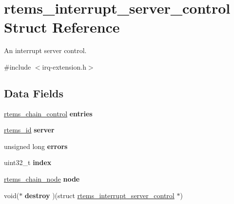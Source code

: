 \hypertarget{structrtems__interrupt__server__control}{}\section{rtems\+\_\+interrupt\+\_\+server\+\_\+control Struct Reference}
\label{structrtems__interrupt__server__control}


An interrupt server control.  




{\ttfamily \#include $<$irq-\/extension.\+h$>$}

\subsection*{Data Fields}
\begin{DoxyCompactItemize}
\item 
\mbox{\label{structrtems__interrupt__server__control_a91b3686366e64c1216310de226b7f9e7}} 
\mbox{\hyperlink{unionChain__Control}{rtems\+\_\+chain\+\_\+control}} {\bfseries entries}
\item 
\mbox{\label{structrtems__interrupt__server__control_acb51ea8df7c1eca203c68b6bb639a3d9}} 
\mbox{\hyperlink{group__ClassicTasks_gab20892b814dced7dd4e5b9bf42becd57}{rtems\+\_\+id}} {\bfseries server}
\item 
\mbox{\label{structrtems__interrupt__server__control_af66482f88e659d7454e3f35f92bec139}} 
unsigned long {\bfseries errors}
\item 
\mbox{\label{structrtems__interrupt__server__control_a720158c3f91c25ab0c2a77175e645759}} 
uint32\+\_\+t {\bfseries index}
\item 
\mbox{\label{structrtems__interrupt__server__control_a9e15d49b75209f3db85605beaf36ddbf}} 
\mbox{\hyperlink{structChain__Node__struct}{rtems\+\_\+chain\+\_\+node}} {\bfseries node}
\item 
\mbox{\label{structrtems__interrupt__server__control_a92304bf68c5714c67a14f0a25eacf1ed}} 
void($\ast$ {\bfseries destroy} )(struct \mbox{\hyperlink{structrtems__interrupt__server__control}{rtems\+\_\+interrupt\+\_\+server\+\_\+control}} $\ast$)
\end{DoxyCompactItemize}


